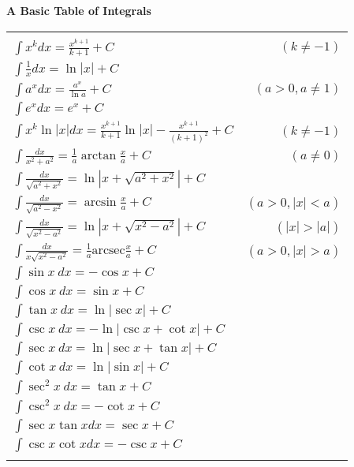 \documentclass{ximera}
\begin{document}
\begin{center}
\textbf{A Basic Table of Integrals} \\
\begin{tabular}{|lr|}
\hline
\vspace{-10pt}&   \\
$\displaystyle \int x^k dx = \frac{x^{k+1}}{k+1} + C$ & $(k \neq -1)$ \\ $\displaystyle \int \frac{1}{x} dx = \ln |x| + C$ & \\
$\displaystyle \int a^x dx = \frac{a^x}{\ln a} + C$  &  $(a > 0, a \neq 1)$  \\   $\displaystyle \int e^x dx = e^x + C$ & \\
$\displaystyle \int x^k \ln |x| dx = \frac{x^{k+1}}{k+1} \ln |x| - \frac{x^{k+1}}{(k+1)^2} + C$  \hspace{-8pt} & $(k \neq -1)$  \\  $\displaystyle \int \frac{dx}{x^2 + a^2} = \frac{1}{a} \arctan \frac{x}{a} + C$ & $(a \neq 0)$ \\
$\displaystyle \int \frac{dx}{\sqrt{a^2 + x^2}} = \ln \left|x + \sqrt{a^2 + x^2}\right| + C$ & \\ $\displaystyle \int \frac{dx}{\sqrt{a^2 - x^2}} = \arcsin \frac{x}{a} + C$ & $(a > 0, |x| < a)$  \\
$\displaystyle \int \frac{dx}{\sqrt{x^2 - a^2}} = \ln \left| x + \sqrt{x^2-a^2} \right| + C$ & $(|x| > |a|)$ \\ $\displaystyle \int \frac{dx}{x \sqrt{x^2 - a^2}} = \frac{1}{a} \mathrm{arcsec} \frac{x}{a} + C$ & $(a > 0, |x| > a)$ \\
$\displaystyle \int \sin x ~dx = - \cos x + C$ & \\ $\displaystyle \int \cos x ~dx = \sin x + C$ & \\
$\displaystyle \int \tan x ~dx = \ln |\sec x| + C$ & \\ $\displaystyle \int \csc x ~dx = - \ln |\csc x + \cot x| + C$ \hspace{-18pt} & \\
$\displaystyle \int \sec x ~dx = \ln |\sec x + \tan x| + C$ & \\ $\displaystyle \int \cot x ~dx = \ln |\sin x| + C$ & \\
$\displaystyle \int \sec^2 x ~ dx = \tan x + C$ & \\ $\displaystyle \int \csc^2 x ~dx = - \cot x + C$ & \\
$\displaystyle \int \sec x \tan x dx = \sec x + C$  & \\ $\displaystyle \int \csc x \cot x dx = - \csc x + C$ &  \vspace{-8pt} \\
&   \\
\hline
\end{tabular}
\end{center}
\end{document}
